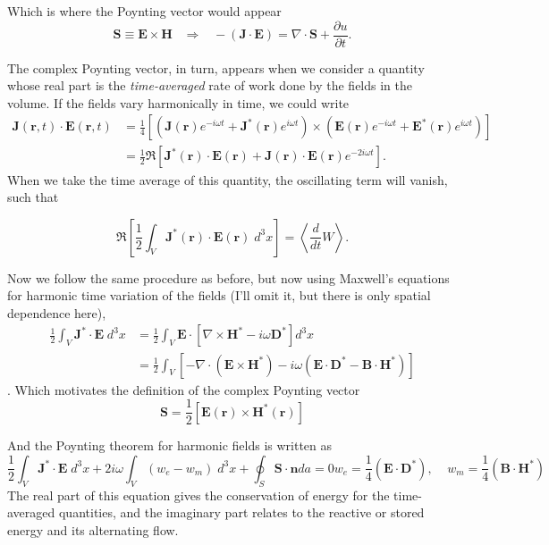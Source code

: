 Which is where the Poynting vector would appear
%
\begin{equation}
\boxed{\textbf{S}\equiv\textbf{E}\times\textbf{H}\;\;\;\Rightarrow\;\;\;-(\textbf{J}\cdot\textbf{E})=\nabla\cdot\textbf{S}+\frac{\partial u}{\partial t}}.
\end{equation}

The complex Poynting vector, in turn, appears when we consider a quantity whose real part is the \textit{time-averaged} rate of work done by the fields in the volume. If the fields vary harmonically in time, we could write
%
\begin{align}
\textbf{J}(\textbf{r},t)\cdot\textbf{E}(\textbf{r},t)&=\frac{1}{4}\left[\left(\textbf{J}(\textbf{r})e^{-i\omega t}+\textbf{J}^*(\textbf{r})e^{i\omega t}\right)\times\left(\textbf{E}(\textbf{r})e^{-i\omega t}+\textbf{E}^*(\textbf{r})e^{i\omega t}\right)\right]\\
&=\frac{1}{2}\Re\left[\textbf{J}^*(\textbf{r})\cdot\textbf{E}(\textbf{r})+\textbf{J}(\textbf{r})\cdot\textbf{E}(\textbf{r})e^{-2i\omega t}\right].
\end{align}
%
When we take the time average of this quantity, the oscillating term will vanish, such that
%

\begin{equation}
    \Re\left[\frac{1}{2}\int_V \textbf{J}^*(\textbf{r})\cdot\textbf{E}(\textbf{r})\;d^3x\right]=\left\langle\frac{d}{dt}W\right\rangle.
\end{equation}

Now we follow the same procedure as before, but now using Maxwell's equations for harmonic time variation of the fields (I'll omit it, but there is only spatial dependence here),
%
\begin{align}
    \frac{1}{2}\int_V \textbf{J}^*\cdot\textbf{E}\;d^3x&=\frac{1}{2}\int_V\textbf{E}\cdot\left[\nabla\times\textbf{H}^*-i\omega\textbf{D}^*\right]d^3x\\
    &= \frac{1}{2}\int_V\left[-\nabla\cdot(\textbf{E}\times\textbf{H}^*)-i\omega(\textbf{E}\cdot\textbf{D}^*-\textbf{B}\cdot\textbf{H}^*)\right]
\end{align}.
%
Which motivates the definition of the complex Poynting vector
\begin{equation*}
    \textbf{S}=\frac{1}{2}\left[\textbf{E}(\textbf{r})\times\textbf{H}^*(\textbf{r})\right]
\end{equation*}

And the Poynting theorem for harmonic fields is written as
\begin{subequations}
\begin{equation}
    \frac{1}{2}\int_V\textbf{J}^*\cdot \textbf{E} \;d^3x+2i\omega\int_V(w_e-w_m)\;d^3x+\oint_S\textbf{S}\cdot\textbf{n}da=0
\end{equation}
\begin{equation}
    w_e=\frac{1}{4}(\textbf{E}\cdot\textbf{D}^*),\;\;\;\;w_m=\frac{1}{4}(\textbf{B}\cdot\textbf{H}^*)
\end{equation}
\end{subequations}
The real part of this equation gives the conservation of energy for the time-averaged quantities, and the imaginary part relates to the reactive or stored energy and its alternating flow.

